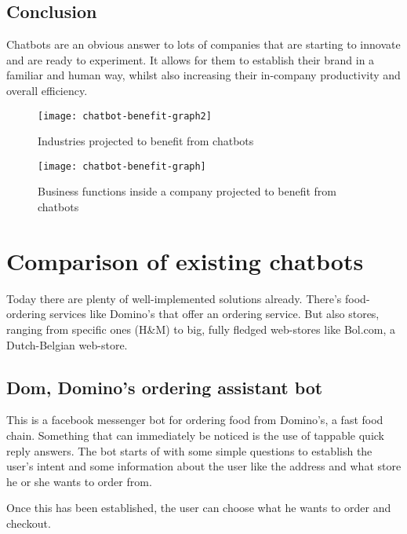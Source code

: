 \subsection{Conclusion}

Chatbots are an obvious answer to lots of companies that are starting to innovate and are ready to experiment. It allows for them to establish their brand in a familiar and human way, whilst also increasing their in-company productivity and overall efficiency.

\begin{figure}[p]
	\centering
	\texttt{[image: chatbot-benefit-graph2]}\label{fig:chatbot-benefit-graph2}
	\caption{Industries projected to benefit from chatbots~\cite{chatbot-industry-benefits}}
\end{figure}

\begin{figure}[p]
	\centering
	\texttt{[image: chatbot-benefit-graph]}\label{fig:chatbot-benefit-graph}
	\caption{Business functions inside a company projected to benefit from chatbots~\cite{chatbot-industry-benefits}}
\end{figure}

\newpage

\section{Comparison of existing chatbots}

Today there are plenty of well-implemented solutions already. There's food-ordering services like Domino's that offer an ordering service. But also stores, ranging from specific ones (H\&M) to big, fully fledged web-stores like Bol.com, a Dutch-Belgian web-store.

\subsection{Dom, Domino's ordering assistant bot}

This is a facebook messenger bot for ordering food from Domino's, a fast food chain. Something that can immediately be noticed is the use of tappable quick reply answers. The bot starts of with some simple questions to establish the user's intent and some information about the user like the address and what store he or she wants to order from.

Once this has been established, the user can choose what he wants to order and checkout.

